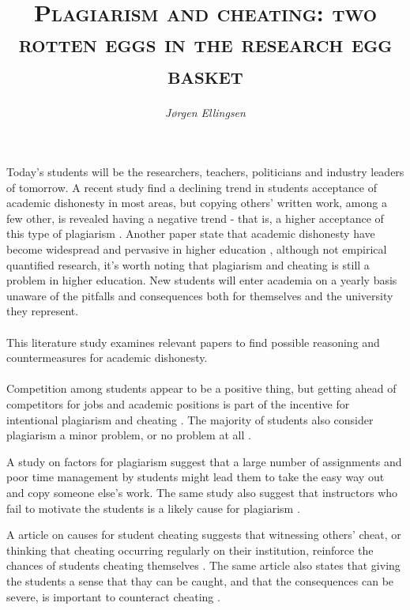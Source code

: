 \documentclass[12pt,a4paper]{article}
\author{\textit{Jørgen Ellingsen}}
\title{\textsc{Plagiarism and cheating: two rotten eggs in the research egg basket}}
\begin{document}
\maketitle
\date{}

Today's students will be the researchers, teachers, politicians and industry leaders of tomorrow. A recent study find a declining trend in students acceptance of academic dishonesty in most areas, but copying others' written work, among a few other, is revealed having a negative trend - that is, a higher acceptance of this type of plagiarism \cite{Molnar2015}. Another paper state that academic dishonesty have become widespread and pervasive in higher education \cite{Dalal2015}, although not empirical quantified research, it's worth noting that plagiarism and cheating is still a problem in higher education. New students will enter academia on a yearly basis unaware of the pitfalls and consequences both for themselves and the university they represent. 
\\ \\ %
This literature study examines relevant papers to find possible reasoning and countermeasures for academic dishonesty. 
\\ \\ %
Competition among students appear to be a positive thing, but getting ahead of competitors for jobs and academic positions is part of the incentive for intentional plagiarism and cheating \cite{Teixeira2010}. The  majority of students also consider plagiarism a minor problem, or no problem at all \cite{Teixeira2010}.

A study on factors for plagiarism suggest that a large number of assignments and poor time management by students might lead them to take the easy way out and copy someone else's work. The same study also suggest that instructors who fail to motivate the students is a likely cause for plagiarism \cite{Comas-Forgas2010}.

A article on causes for student cheating suggests that witnessing others' cheat, or thinking that cheating occurring regularly on their institution, reinforce the chances of students cheating themselves \cite{Rettinger2009}. The same article also states that giving the students a sense that thay can be caught, and that the consequences can be severe, is important to counteract cheating \cite{Rettinger2009}.
\end{document}

